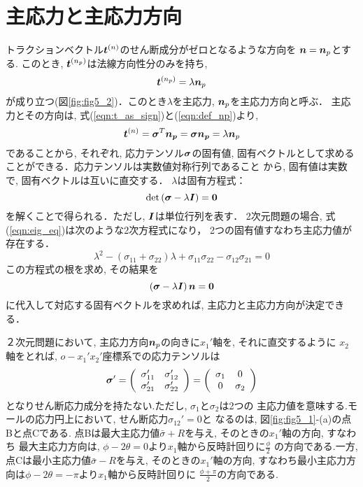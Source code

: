 \documentclass[10pt,a4j]{jarticle}
\begin{document}
\section{主応力と主応力方向}
トラクションベクトル$\mbox{\boldmath $t$}^{(n)}$のせん断成分がゼロとなるような方向を
$\mbox{\boldmath $n$}=\mbox{\boldmath $n$}_p$とする. このとき, $\mbox{\boldmath $t$}^{(n_p)}$は法線方向性分のみを持ち, 
\begin{equation}
	\mbox{\boldmath $t$}^{(n_p)}=\lambda \mbox{\boldmath $n$}_p
	\label{eqn:def_np}
\end{equation}
が成り立つ(図\ref{fig:fig5_2})．このとき$\lambda$を主応力, $\mbox{\boldmath $n$}_p$を主応力方向と呼ぶ．
主応力とその方向は, 式(\ref{eqn:t_as_sign})と(\ref{eqn:def_np})より, 
\begin{equation}
	\mbox{\boldmath $t$}^{(n)}
	=\mbox{\boldmath $\sigma$}^T \mbox{\boldmath $n_p$} 
	=\mbox{\boldmath $\sigma$}\mbox{\boldmath $n_p$} 
	=\lambda \mbox{\boldmath $n$}_p
\end{equation}
であることから, それぞれ, 応力テンソル$\mbox{\boldmath $\sigma$}$の固有値, 
固有ベクトルとして求めることができる．応力テンソルは実数値対称行列であること
から, 固有値は実数で, 固有ベクトルは互いに直交する．
$\lambda$は固有方程式：
\begin{equation}
	{\rm det} \left( \mbox{\boldmath $\sigma$}- \lambda \mbox{\boldmath $I$} \right) =\mbox{\boldmath $0$} 
	\label{eqn:eig_eq}
\end{equation}
を解くことで得られる．ただし, $\mbox{\boldmath $I$}$は単位行列を表す．
2次元問題の場合, 式(\ref{eqn:eig_eq})は次のような2次方程式になり，
2つの固有値すなわち主応力値が存在する．
\begin{equation}
	\lambda^2 -\left( \sigma_{11}+\sigma_{22}\right)\lambda + 
	\sigma_{11}\sigma_{22}-\sigma_{12}\sigma_{21}=0
	\label{eqn:eig_eq_2d}
\end{equation}
この方程式の根を求め, その結果を
\begin{equation}
	\left( \mbox{\boldmath $\sigma$} -\lambda \mbox{\boldmath $I$} \right) \mbox{\boldmath $n$}=\mbox{\boldmath $0$}
\end{equation}
に代入して対応する固有ベクトルを求めれば, 主応力と主応力方向が決定できる．

２次元問題において, 主応力方向$\mbox{\boldmath $n$}_p$の向きに$x_1'$軸を, それに直交するように
$x_2$軸をとれば, $o-x_1'x_2'$座標系での応力テンソルは
\begin{equation}
	\mbox{\boldmath $\sigma$}'
	=
	\left(
	\begin{array}{cc}
		\sigma_{11}' & \sigma_{12}' \\
		\sigma_{21}' & \sigma_{22}' 
	\end{array}
	\right)
	=
	\left(
	\begin{array}{cc}
		\sigma_1 & 0 \\
		0 & \sigma_2
	\end{array}
	\right)
\end{equation}
となりせん断応力成分を持たない.ただし, $\sigma_1$と$\sigma_2$は2つの
主応力値を意味する.モールの応力円上において, せん断応力$\sigma_{12}'=0$と
なるのは, 図\ref{fig:fig5_1}-(a)の点Bと点Cである.
点Bは最大主応力値$\bar{\sigma}+R$を与え, そのときの$x_1'$軸の方向, すなわち
最大主応力方向は, $\phi -2 \theta =0 $より$x_1$軸から反時計回りに$\frac{\phi}{2}$
の方向である.一方, 点Cは最小主応力値$\bar{\sigma}-R$を与え, そのときの$x_1'$軸の方向, 
すなわち最小主応力方向は$\phi -2 \theta =- \pi $より$x_1$軸から反時計回りに
$\frac{\phi+\pi}{2}$の方向である.
\newpage
\end{document}
